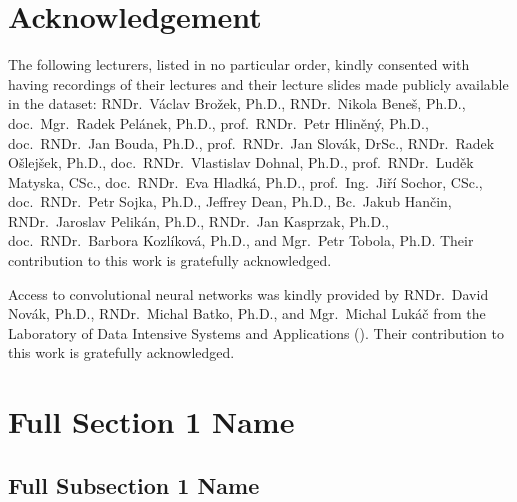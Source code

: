 \section*{Acknowledgement}
The following lecturers, listed in no particular order, kindly consented with
having recordings of their lectures and their lecture slides made publicly
available in the dataset:
RNDr.\ Václav Brožek, Ph.D.,
RNDr.\ Nikola Beneš, Ph.D.,
doc.\ Mgr.\ Radek Pelánek, Ph.D.,
prof.\ RNDr.\ Petr Hliněný, Ph.D.,
doc.\ RNDr.\ Jan Bouda, Ph.D.,
prof.\ RNDr.\ Jan Slovák, DrSc.,
RNDr.\ Radek Ošlejšek, Ph.D.,
doc.\ RNDr.\ Vlastislav Dohnal, Ph.D.,
prof.\ RNDr.\ Luděk Matyska, CSc.,
doc.\ RNDr.\ Eva Hladká, Ph.D.,
prof.\ Ing.\ Jiří Sochor, CSc.,
doc.\ RNDr.\ Petr Sojka, Ph.D.,
Jeffrey Dean, Ph.D.,
Bc.\ Jakub Hančin,
RNDr.\ Jaroslav Pelikán, Ph.D.,
RNDr.\ Jan Kasprzak, Ph.D.,
doc.\ RNDr.\ Barbora Kozlíková, Ph.D., and
Mgr.\ Petr Tobola, Ph.D.
Their contribution to this work is gratefully acknowledged.

Access to  convolutional neural networks was kindly provided by
RNDr.\ David Novák, Ph.D.,
RNDr.\ Michal Batko, Ph.D., and
Mgr.\ Michal Lukáč
from the Laboratory of Data Intensive Systems and Applications ().
Their contribution to this work is gratefully acknowledged.

\iffalse

\section[Short Section 1 Name]{Full Section 1 Name}
\subsection[Short Subsection 1 Name]{Full Subsection 1 Name}


